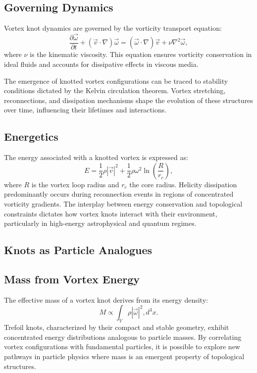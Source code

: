 \documentclass[a4paper,10pt]{article}
\begin{document}
\subsection*{Governing Dynamics}


Vortex knot dynamics are governed by the vorticity transport equation:
\begin{equation*}
\frac{\partial \vec{\omega}}{\partial t} + (\vec{v} \cdot \nabla) \vec{\omega} = (\vec{\omega} \cdot \nabla) \vec{v} + \nu \nabla^2 \vec{\omega},
\end{equation*}
where $\nu$ is the kinematic viscosity. This equation ensures vorticity conservation in ideal fluids and accounts for dissipative effects in viscous media.


The emergence of knotted vortex configurations can be traced to stability conditions dictated by the Kelvin circulation theorem. Vortex stretching, reconnections, and dissipation mechanisms shape the evolution of these structures over time, influencing their lifetimes and interactions.


\subsection*{Energetics}


The energy associated with a knotted vortex is expressed as:
\begin{equation*}
E = \frac{1}{2} \rho |\vec{v}|^2 + \frac{1}{2} \rho \omega^2 \ln \left( \frac{R}{r_c} \right),
\end{equation*}
where $R$ is the vortex loop radius and $r_c$ the core radius. Helicity dissipation predominantly occurs during reconnection events in regions of concentrated vorticity gradients. The interplay between energy conservation and topological constraints dictates how vortex knots interact with their environment, particularly in high-energy astrophysical and quantum regimes.


\subsection*{Knots as Particle Analogues}


\subsection*{Mass from Vortex Energy}


The effective mass of a vortex knot derives from its energy density:
\begin{equation*}
M \propto \int_V \rho |\vec{\omega}|^2 , d^3x.
\end{equation*}
Trefoil knots, characterized by their compact and stable geometry, exhibit concentrated energy distributions analogous to particle masses. By correlating vortex configurations with fundamental particles, it is possible to explore new pathways in particle physics where mass is an emergent property of topological structures.
\end{document}
